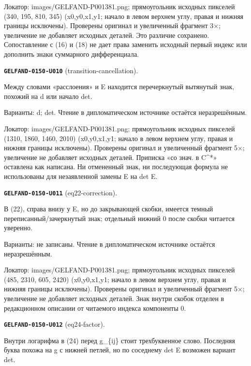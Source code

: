 \documentclass[11pt]{article}
\theoremstyle{definition}
\theoremstyle{remark}
\begin{document}
Локатор: images/GELFAND-P001381.png; прямоугольник исходных пикселей (340, 195, 810, 345) (x0,y0,x1,y1; начало в левом верхнем углу, правая и нижняя границы исключены). Проверены оригинал и увеличенный фрагмент 3×; увеличение не добавляет исходных деталей. Это различие сохранено. Сопоставление с (16) и (18) не дает права заменить исходный первый индекс или дополнить знаки суммарного дифференциала.\par\medskip
\noindent\leavevmode{}\label{GELFAND-P001381:transition-cancellation:note}\textbf{\texttt{GELFAND-0150-U010}} (transition-cancellation).\par\nopagebreak[4]
Между словами «расслоения» и E находится перечеркнутый вытянутый знак, похожий на d или начало det.\par
Варианты: d; det. Чтение в дипломатическом источнике остаётся неразрешённым.\par
Локатор: images/GELFAND-P001381.png; прямоугольник исходных пикселей (1310, 1860, 1460, 2010) (x0,y0,x1,y1; начало в левом верхнем углу, правая и нижняя границы исключены). Проверены оригинал и увеличенный фрагмент 5×; увеличение не добавляет исходных деталей. Приписка «со знач. в C\textasciicircum{}*» оставлена как написана. Ни отмененный знак, ни последующая формула не использованы для незаявленной замены E на det E.\par\medskip
\noindent\leavevmode{}\label{GELFAND-P001381:eq22-correction:note}\textbf{\texttt{GELFAND-0150-U011}} (eq22-correction).\par\nopagebreak[4]
В (22), справа внизу у E, но до закрывающей скобки, имеется темный переписанный/зачеркнутый знак; отдельный нижний 0 после скобки читается уверенно.\par
Варианты: не записаны. Чтение в дипломатическом источнике остаётся неразрешённым.\par
Локатор: images/GELFAND-P001381.png; прямоугольник исходных пикселей (485, 2310, 605, 2420) (x0,y0,x1,y1; начало в левом верхнем углу, правая и нижняя границы исключены). Проверены оригинал и увеличенный фрагмент 5×; увеличение не добавляет исходных деталей. Знак внутри скобок отделен в редакционном описании от читаемого индекса компоненты 0.\par\medskip
\noindent\leavevmode{}\label{GELFAND-P001381:eq24-factor:note}\textbf{\texttt{GELFAND-0150-U012}} (eq24-factor).\par\nopagebreak[4]
Внутри логарифма в (24) перед g\_\{ij\} стоит трехбуквенное слово. Последняя буква похожа на g с нижней петлей, но по соседнему det E возможен вариант det.\par
\end{document}

